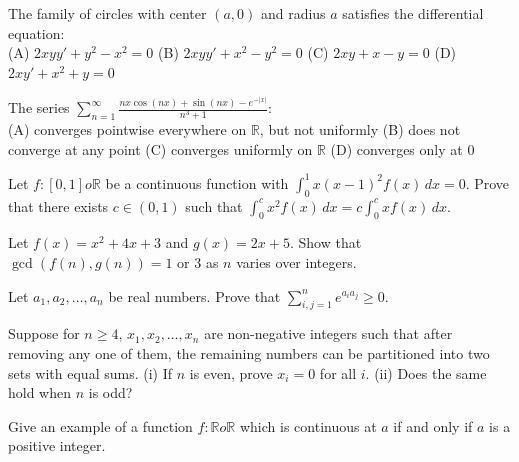 \documentclass[11pt,a4paper]{article}
\begin{document}
\begin{parts}
  \item The family of circles with center $(a, 0)$ and radius $a$ satisfies the differential equation: \\
  (A) $2xy y' + y^2 - x^2 = 0$ \quad (B) $2xy y' + x^2 - y^2 = 0$ \quad (C) $2xy + x - y = 0$ \quad (D) $2xy' + x^2 + y = 0$

  \item The series $\sum_{n=1}^\infty \frac{n x \cos(n x) + \sin(n x) - e^{-|x|}}{n^3 + 1}$: \\
  (A) converges pointwise everywhere on $\mathbb{R}$, but not uniformly \quad (B) does not converge at any point \quad (C) converges uniformly on $\mathbb{R}$ \quad (D) converges only at 0
\end{parts}

\bigskip




\begin{parts}
  \item Let $f: [0, 1]  o \mathbb{R}$ be a continuous function with $\int_0^1 x(x-1)^2 f(x) \, dx = 0$. Prove that there exists $c \in (0, 1)$ such that $\int_0^c x^2 f(x) \, dx = c \int_0^c x f(x) \, dx$.
  \item Let $f(x) = x^2 + 4x + 3$ and $g(x) = 2x + 5$. Show that $\gcd(f(n), g(n)) = 1  \text{ or } 3$ as $n$ varies over integers.
  \item Let $a_1, a_2, \dots, a_n$ be real numbers. Prove that $\sum_{i,j=1}^n e^{a_i a_j} \ge 0$.
  \item Suppose for $n \ge 4$, $x_1, x_2, \dots, x_n$ are non-negative integers such that after removing any one of them, the remaining numbers can be partitioned into two sets with equal sums. (i) If $n$ is even, prove $x_i = 0$ for all $i$. (ii) Does the same hold when $n$ is odd?
  \item Give an example of a function $f: \mathbb{R}  o \mathbb{R}$ which is continuous at $a$ if and only if $a$ is a positive integer.
\end{parts}

\bigskip



\end{document}
